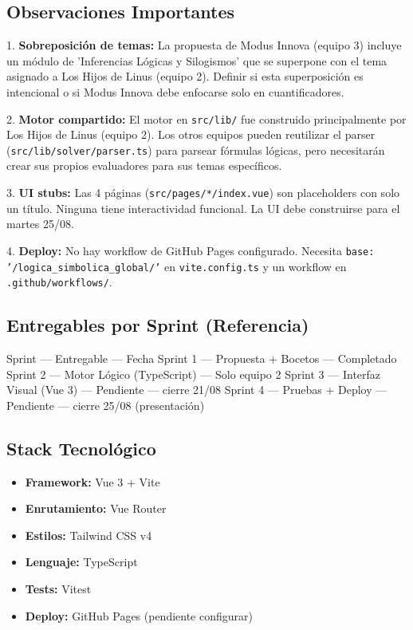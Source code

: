 \documentclass[11pt,a4paper,openany]{book}
\begin{document}
\hrulefill

\subsection{Observaciones Importantes}

1. \textbf{Sobreposición de temas:} La propuesta de Modus Innova (equipo 3) incluye un módulo de 'Inferencias Lógicas y Silogismos' que se superpone con el tema asignado a Los Hijos de Linus (equipo 2). Definir si esta superposición es intencional o si Modus Innova debe enfocarse solo en cuantificadores.

2. \textbf{Motor compartido:} El motor en \texttt{src/lib/} fue construido principalmente por Los Hijos de Linus (equipo 2). Los otros equipos pueden reutilizar el parser (\texttt{src/lib/solver/parser.ts}) para parsear fórmulas lógicas, pero necesitarán crear sus propios evaluadores para sus temas específicos.

3. \textbf{UI stubs:} Las 4 páginas (\texttt{src/pages/*/index.vue}) son placeholders con solo un título. Ninguna tiene interactividad funcional. La UI debe construirse para el martes 25/08.

4. \textbf{Deploy:} No hay workflow de GitHub Pages configurado. Necesita \texttt{base: '/logica\_simbolica\_global/'} en \texttt{vite.config.ts} y un workflow en \texttt{.github/workflows/}.

\hrulefill

\subsection{Entregables por Sprint (Referencia)}

Sprint --- Entregable --- Fecha
Sprint 1 --- Propuesta + Bocetos --- Completado
Sprint 2 --- Motor Lógico (TypeScript) --- Solo equipo 2
Sprint 3 --- Interfaz Visual (Vue 3) --- Pendiente --- cierre 21/08
Sprint 4 --- Pruebas + Deploy --- Pendiente --- cierre 25/08 (presentación)

\hrulefill

\subsection{Stack Tecnológico}

\begin{itemize}[leftmargin=*]
\item \textbf{Framework:} Vue 3 + Vite
\item \textbf{Enrutamiento:} Vue Router
\item \textbf{Estilos:} Tailwind CSS v4
\item \textbf{Lenguaje:} TypeScript
\item \textbf{Tests:} Vitest
\item \textbf{Deploy:} GitHub Pages (pendiente configurar)
\end{itemize}
\end{document}
